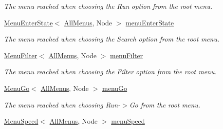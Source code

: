 \begin{DoxyCompactItemize}
\begin{DoxyCompactList}\small\item\em The menu reached when choosing the Run option from the root menu. \end{DoxyCompactList}\item 
\hyperlink{structslb_1_1core_1_1ui_1_1MenuEnterState}{Menu\+Enter\+State}$<$ \hyperlink{structslb_1_1core_1_1ui_1_1AllMenus}{All\+Menus}, Node $>$ \hyperlink{structslb_1_1core_1_1ui_1_1AllMenus_aaec00610ffe8e6dbd315d6ffbe956180}{menu\+Enter\+State}\hypertarget{structslb_1_1core_1_1ui_1_1AllMenus_aaec00610ffe8e6dbd315d6ffbe956180}{}\label{structslb_1_1core_1_1ui_1_1AllMenus_aaec00610ffe8e6dbd315d6ffbe956180}

\begin{DoxyCompactList}\small\item\em The menu reached when choosing the Search option from the root menu. \end{DoxyCompactList}\item 
\hyperlink{structslb_1_1core_1_1ui_1_1MenuFilter}{Menu\+Filter}$<$ \hyperlink{structslb_1_1core_1_1ui_1_1AllMenus}{All\+Menus}, Node $>$ \hyperlink{structslb_1_1core_1_1ui_1_1AllMenus_a3e154d2bfbc402ccc7d492de205aa6fe}{menu\+Filter}\hypertarget{structslb_1_1core_1_1ui_1_1AllMenus_a3e154d2bfbc402ccc7d492de205aa6fe}{}\label{structslb_1_1core_1_1ui_1_1AllMenus_a3e154d2bfbc402ccc7d492de205aa6fe}

\begin{DoxyCompactList}\small\item\em The menu reached when choosing the \hyperlink{structslb_1_1core_1_1ui_1_1Filter}{Filter} option from the root menu. \end{DoxyCompactList}\item 
\hyperlink{structslb_1_1core_1_1ui_1_1MenuGo}{Menu\+Go}$<$ \hyperlink{structslb_1_1core_1_1ui_1_1AllMenus}{All\+Menus}, Node $>$ \hyperlink{structslb_1_1core_1_1ui_1_1AllMenus_afb4250552b678cff7923b3bc57578bf4}{menu\+Go}\hypertarget{structslb_1_1core_1_1ui_1_1AllMenus_afb4250552b678cff7923b3bc57578bf4}{}\label{structslb_1_1core_1_1ui_1_1AllMenus_afb4250552b678cff7923b3bc57578bf4}

\begin{DoxyCompactList}\small\item\em The menu reached when choosing Run-\/$>$Go from the root menu. \end{DoxyCompactList}\item 
\hyperlink{structslb_1_1core_1_1ui_1_1MenuSpeed}{Menu\+Speed}$<$ \hyperlink{structslb_1_1core_1_1ui_1_1AllMenus}{All\+Menus}, Node $>$ \hyperlink{structslb_1_1core_1_1ui_1_1AllMenus_a353107b85b590f53dba00cf6bc73013f}{menu\+Speed}\hypertarget{structslb_1_1core_1_1ui_1_1AllMenus_a353107b85b590f53dba00cf6bc73013f}{}\label{structslb_1_1core_1_1ui_1_1AllMenus_a353107b85b590f53dba00cf6bc73013f}


\end{DoxyCompactItemize}
